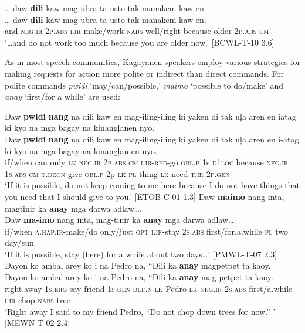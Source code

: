 \ea 
… daw  \textbf{dili}  kaw  mag-ubra  ta  usto  tak  manakem  kaw  en. \\\smallskip
\gll … daw  \textbf{dili}  kaw  mag-ubra  ta  usto  tak  manakem  kaw  en. \\
{} and  \textsc{neg.ir}  2\textsc{p.abs}  \textsc{i.ir}-make/work  \textsc{nabs}  well/right  because  older  2\textsc{p.abs}  \textsc{cm} \\
\glt ‘…and do not work too much because you are older now.’ [BCWL-T-10 3.6]
\z

 As in most speech communities, Kagayanen speakers employ various strategies for making requests for action more polite or indirect than direct commands. For polite commands \textit{pwidi} ‘may/can/possible,’ \textit{maimo} ‘possible to do/make’ and \textit{anay} ‘first/for a while’ are used:

\ea 
Daw  \textbf{pwidi}  \textbf{nang}  na  dili  kaw  en  mag-iling-iling  ki  yaken di  tak  uļa  aren  en  iatag  ki  kyo  na  mga  bagay na  kinangļanen  nyo. \\\smallskip
\gll Daw  \textbf{pwidi}  \textbf{nang}  na  dili  kaw  en  mag-iling-iling  ki  yaken di  tak  uļa  aren  en  i-atag  ki  kyo  na  mga  bagay na  kinangļan-en  nyo. \\
if/when  can  only  \textsc{lk}  \textsc{neg.ir}  2\textsc{p.abs}  \textsc{cm}  \textsc{i.ir}-\textsc{red}-go  \textsc{obl.p}  1s
\textsc{d}1\textsc{loc}  because  \textsc{neg.ir}  1\textsc{s.abs}  \textsc{cm}  \textsc{t.deon}-give  \textsc{obl.p}  2p  \textsc{lk}  \textsc{pl}  thing
\textsc{lk}  need-\textsc{t.ir}  2\textsc{p.gen} \\
\glt `If it is possible, do not keep coming to me here because I do not have things that you need that I should give to you.’ [ETOB-C-01 1.3]
\z
\ea 
\label{bkm:Ref113971261}
Daw  \textbf{maimo}  nang  inta,  magtinir  ka  \textbf{anay}  mga darwa  adlaw…. \\\smallskip
\gll Daw  \textbf{ma-imo}  nang  inta,  mag-tinir  ka  \textbf{anay}  mga darwa  adlaw…. \\
if/when  \textsc{a.hap.ir}-make/do  only/just  \textsc{opt}  \textsc{i.ir}-stay  2\textsc{s.abs}  first/for.a.while  \textsc{pl} two  day/sun \\
\glt ‘If it is possible, stay (here) for a while about two days…’ [PMWL-T-07 2.3]
\z
\ea 
Dayon  ko  ambaļ  arey  ko  i  na  Pedro  na,  “Dili  ka \textbf{anay}  magpetpet  ta  kaoy. \\\smallskip
\gll Dayon  ko  ambaļ  arey  ko  i  na  Pedro  na,  “Dili  ka \textbf{anay}  mag-petpet  ta  kaoy. \\
right.away  1\textsc{s.erg}  say  friend  1\textsc{s.gen}  \textsc{def.n}  \textsc{lk}  Pedro  \textsc{lk}  \textsc{neg.ir}  2\textsc{s.abs}
first/a.while  \textsc{i.ir}-chop  \textsc{nabs}  tree \\
\glt `Right away I said to my friend Pedro, “Do not chop down trees for now.” ' [MEWN-T-02 2.4]
\z

